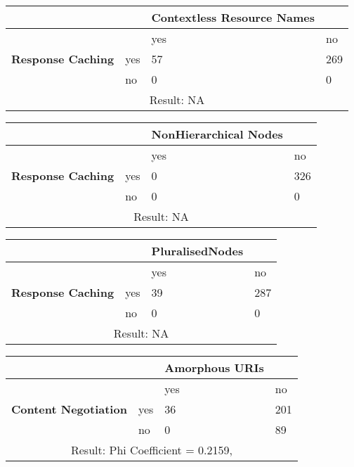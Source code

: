 \documentclass[a4paper,12pt]{article}
\begin{document}
\begin{center}
  \begin{tabular}{| p{60mm} | p{10mm} | p{35mm} | p{35mm} |}
  \hline
   & & \textbf{Contextless Resource Names} &
  \\
  \hline
  & & yes & no
  \\
  \hline
  \textbf{Response Caching} & yes & 57 & 269
  \\
  \hline
   & no & 0 & 0
  \\
  \hline
  \multicolumn{4}{|c|}{Result: NA}
  \\ \hline
  \end{tabular}
  \end{center}

\begin{center}
  \begin{tabular}{| p{60mm} | p{10mm} | p{35mm} | p{35mm} |}
  \hline
   & & \textbf{NonHierarchical Nodes} &
  \\
  \hline
  & & yes & no
  \\
  \hline
  \textbf{Response Caching} & yes & 0 & 326
  \\
  \hline
   & no & 0 & 0
  \\
  \hline
  \multicolumn{4}{|c|}{Result: NA}
  \\ \hline
  \end{tabular}
  \end{center}

\begin{center}
  \begin{tabular}{| p{60mm} | p{10mm} | p{35mm} | p{35mm} |}
  \hline
   & & \textbf{PluralisedNodes} &
  \\
  \hline
  & & yes & no
  \\
  \hline
  \textbf{Response Caching} & yes & 39 & 287
  \\
  \hline
   & no & 0 & 0
  \\
  \hline
  \multicolumn{4}{|c|}{Result: NA}
  \\ \hline
  \end{tabular}
  \end{center}

\begin{center}
  \begin{tabular}{| p{60mm} | p{10mm} | p{35mm} | p{35mm} |}
  \hline
   & & \textbf{Amorphous URIs} &
  \\
  \hline
  & & yes & no
  \\
  \hline
  \textbf{Content Negotiation} & yes & 36 & 201
  \\
  \hline
   & no & 0 & 89
  \\
  \hline
  \multicolumn{4}{|c|}{Result: Phi Coefficient = 0.2159, }
  \\ \hline
  \end{tabular}
  \end{center}
\end{document}
